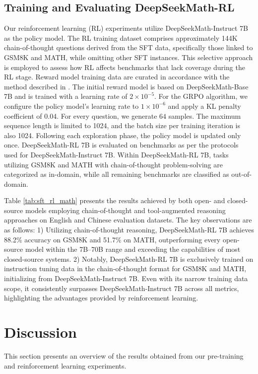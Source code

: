 \begin{itemize}[topsep=0pt]
\begin{itemize}[topsep=0pt]
\subsection{Training and Evaluating DeepSeekMath-RL}

Our reinforcement learning (RL) experiments utilize DeepSeekMath-Instruct 7B as the policy model. The RL training dataset comprises approximately 144K chain-of-thought questions derived from the SFT data, specifically those linked to GSM8K and MATH, while omitting other SFT instances. This selective approach is employed to assess how RL affects benchmarks that lack coverage during the RL stage. Reward model training data are curated in accordance with the method described in \citep{wang2023math}. The initial reward model is based on DeepSeekMath-Base 7B and is trained with a learning rate of $2 \times 10^{-5}$. For the GRPO algorithm, we configure the policy model’s learning rate to $1 \times 10^{-6}$ and apply a KL penalty coefficient of 0.04. For every question, we generate $64$ samples. The maximum sequence length is limited to 1024, and the batch size per training iteration is also 1024. Following each exploration phase, the policy model is updated only once. DeepSeekMath-RL 7B is evaluated on benchmarks as per the protocols used for DeepSeekMath-Instruct 7B. Within DeepSeekMath-RL 7B, tasks utilizing GSM8K and MATH with chain-of-thought problem-solving are categorized as in-domain, while all remaining benchmarks are classified as out-of-domain.

Table \ref{tab:sft_rl_math} presents the results achieved by both open- and closed-source models employing chain-of-thought and tool-augmented reasoning approaches on English and Chinese evaluation datasets. The key observations are as follows: 1) Utilizing chain-of-thought reasoning, DeepSeekMath-RL 7B achieves 88.2\% accuracy on GSM8K and 51.7\% on MATH, outperforming every open-source model within the 7B–70B range and exceeding the capabilities of most closed-source systems. 2) Notably, DeepSeekMath-RL 7B is exclusively trained on instruction tuning data in the chain-of-thought format for GSM8K and MATH, initializing from DeepSeekMath-Instruct 7B. Even with its narrow training data scope, it consistently surpasses DeepSeekMath-Instruct 7B across all metrics, highlighting the advantages provided by reinforcement learning.

\section{Discussion}
This section presents an overview of the results obtained from our pre-training and reinforcement learning experiments.


\end{itemize}
\end{itemize}

